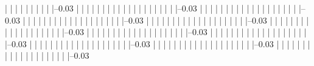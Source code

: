             |          |          |          |          |          |          |          |          |          |--0.03%
            |          |          |          |          |          |          |          |          |          |          
            |          |          |          |          |          |          |          |          |          |--0.03%
            |          |          |          |          |          |          |          |          |          |          
            |          |          |          |          |          |          |          |          |          |--0.03%
            |          |          |          |          |          |          |          |          |          |          
            |          |          |          |          |          |          |          |          |          |--0.03%
            |          |          |          |          |          |          |          |          |          |          
            |          |          |          |          |          |          |          |          |          |--0.03%
            |          |          |          |          |          |          |          |          |          |          
            |          |          |          |          |          |          |          |          |          |--0.03%
            |          |          |          |          |          |          |          |          |          |          
            |          |          |          |          |          |          |          |          |          |--0.03%
            |          |          |          |          |          |          |          |          |          |          
            |          |          |          |          |          |          |          |          |          |--0.03%
            |          |          |          |          |          |          |          |          |          |          
            |          |          |          |          |          |          |          |          |          |--0.03%
            |          |          |          |          |          |          |          |          |          |          
            |          |          |          |          |          |          |          |          |          |--0.03%
            |          |          |          |          |          |          |          |          |          |          
            |          |          |          |          |          |          |          |          |          |--0.03%

